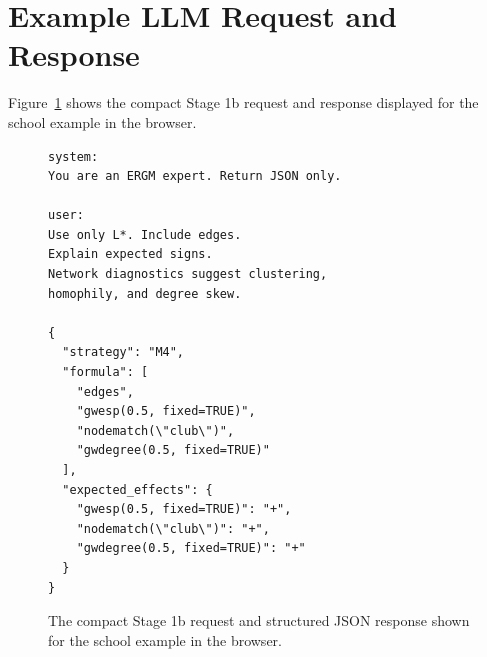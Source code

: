 \documentclass[11pt]{article}
\begin{document}


\appendix

\section{Example LLM Request and Response}
\label{app:record}
Figure~\ref{fig:record} shows the compact Stage 1b request and response displayed for the school example in the browser.

\begin{figure}[ht]
\centering
\small
\begin{verbatim}
system:
You are an ERGM expert. Return JSON only.

user:
Use only L*. Include edges.
Explain expected signs.
Network diagnostics suggest clustering,
homophily, and degree skew.

{
  "strategy": "M4",
  "formula": [
    "edges",
    "gwesp(0.5, fixed=TRUE)",
    "nodematch(\"club\")",
    "gwdegree(0.5, fixed=TRUE)"
  ],
  "expected_effects": {
    "gwesp(0.5, fixed=TRUE)": "+",
    "nodematch(\"club\")": "+",
    "gwdegree(0.5, fixed=TRUE)": "+"
  }
}
\end{verbatim}
\caption{The compact Stage 1b request and structured JSON response shown for the school example in the browser.}
\label{fig:record}
\end{figure}
\end{document}
